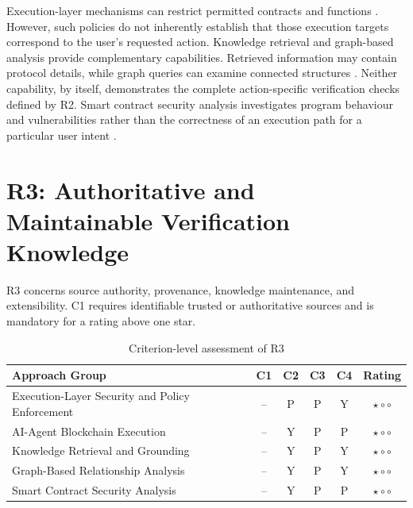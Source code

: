Execution-layer mechanisms can restrict permitted
contracts and functions
\cite{zeroDevPermissionPolicies2026,
safeSmartAccountGuards2026}.
However, such policies do not inherently establish
that those execution targets correspond to the
user's requested action. Knowledge retrieval and graph-based analysis
provide complementary capabilities. Retrieved
information may contain protocol details, while
graph queries can examine connected structures
\cite{edgeGraphRAG2024,
francisCypher2018}. Neither capability, by
itself, demonstrates the complete action-specific
verification checks defined by R2. Smart contract security analysis investigates
program behaviour and vulnerabilities rather
than the correctness of an execution path for
a particular user intent
\cite{feistSlither2019,
liuPropertyGPT2025}.


\section{R3: Authoritative and Maintainable Verification Knowledge}

R3 concerns source authority, provenance, knowledge
maintenance, and extensibility. C1 requires
identifiable trusted or authoritative sources and
is mandatory for a rating above one star.

\begin{table}[H]
\centering
\small
\renewcommand{\arraystretch}{1.25}
\begin{tabular}{p{5.0cm}ccccc}
\hline
\textbf{Approach Group}
& \textbf{C1}
& \textbf{C2}
& \textbf{C3}
& \textbf{C4}
& \textbf{Rating} \\
\hline

Execution-Layer Security and Policy Enforcement
& -- & P & P & Y
& $\star\circ\circ$ \\

AI-Agent Blockchain Execution
& -- & Y & P & P
& $\star\circ\circ$ \\

Knowledge Retrieval and Grounding
& -- & Y & P & Y
& $\star\circ\circ$ \\

Graph-Based Relationship Analysis
& -- & Y & P & Y
& $\star\circ\circ$ \\

Smart Contract Security Analysis
& -- & Y & P & P
& $\star\circ\circ$ \\

\hline
\end{tabular}
\caption{Criterion-level assessment of R3}
\label{tab:appendix_r3}
\end{table}

